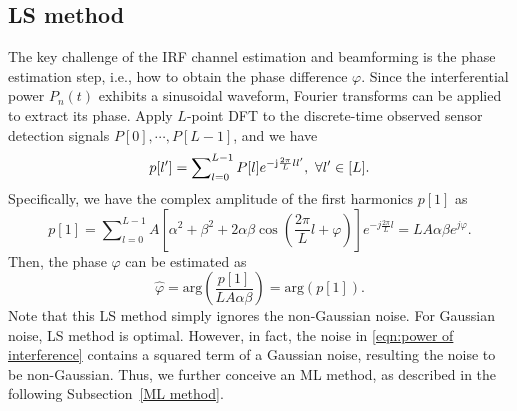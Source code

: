 \documentclass[12pt,draftclsnofoot,journal,onecolumn]{IEEEtran}
\theoremstyle{nonumberplain}
\def \arg {\text{arg}}
\begin{document}
\subsection{LS method}  \label{LS method}
    The key challenge of the IRF channel estimation and beamforming is the phase estimation step, i.e., how to obtain the phase difference $\varphi$. Since the interferential power $P_n(t)$ exhibits a sinusoidal waveform, Fourier transforms can be applied to extract its phase. Apply $L$-point \ac{DFT} to the discrete-time  observed sensor detection signals $P[0],\cdots ,P[L-1]$, and we have
    \begin{equation}
        \label{DFT}
        p[l']=\sum\nolimits_{l=0}^{L-1}P[l]e^{-{\rm j}\frac{2\pi}{L}ll'},~\forall l'\in [L].
    \end{equation}
    Specifically, we have the complex amplitude of the first harmonics $p[1]$ as 
    \begin{equation}
        \label{DFT l=1}
        p[1]=\sum\nolimits_{l=0}^{L-1}A\left[\alpha^{2}+\beta^{2}+2\alpha\beta\cos\left(\frac{2\pi}{L}l+\varphi\right)\right]e^{-j\frac{2\pi}{L}l}=LA\alpha\beta  e^{j\varphi}.
    \end{equation}
    Then, the phase $\varphi$ can be estimated as
    \begin{equation}
        \label{LS estimate result}
        \hat{\varphi}=\arg\left(\frac{p[1]}{LA\alpha\beta}\right) = \arg\left(p[1]\right).
    \end{equation}
    Note that this LS method simply ignores the non-Gaussian noise. For Gaussian noise, LS method is optimal. However, in fact, the noise in \eqref{eqn:power of interference} contains a squared term of a Gaussian noise, resulting the noise to be non-Gaussian. Thus, we further conceive an ML method, as described in the following Subsection~\ref{ML method}. 
\end{document}
